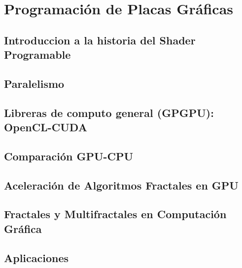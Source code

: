 \chapter{Programación de Placas Gráficas}
\section{Introduccion a la historia del Shader Programable}
\section{Paralelismo}
\section{Libreras de computo general (GPGPU): OpenCL-CUDA}
\section{Comparación GPU-CPU}
\section{Aceleración de Algoritmos Fractales en GPU}
\section{Fractales y Multifractales en Computación Gráfica}
\section{Aplicaciones}

